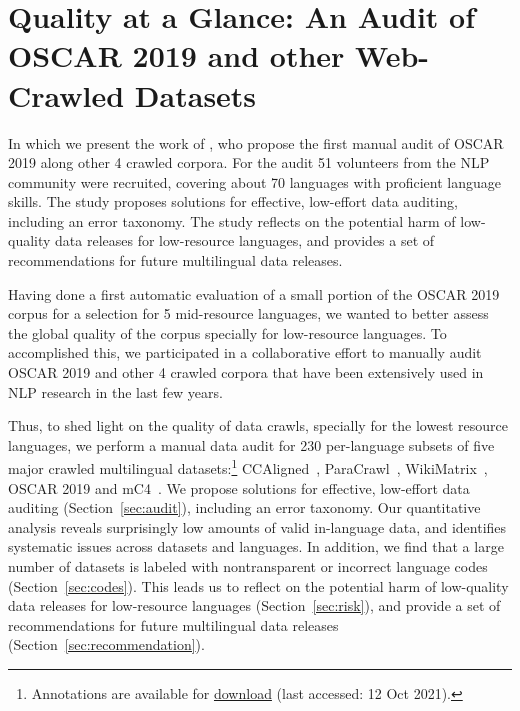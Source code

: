 \chapter{Quality at a Glance: An Audit of OSCAR 2019 and other Web-Crawled Datasets} \label{chap:quality}

\begin{center}
    \begin{minipage}{0.66\textwidth}
        \begin{small}
            In which we present the work of \citet{kreutzer-etal-2021-quality}, who propose the first manual audit of OSCAR 2019 along other 4 crawled corpora. For the audit 51 volunteers from the NLP community were recruited, covering about 70 languages with proficient language skills. The study proposes solutions for effective, low-effort data auditing, including an error taxonomy. The study reflects on the potential harm of low-quality data releases for low-resource languages, and provides a set of recommendations for future multilingual data releases.
        \end{small}
    \end{minipage}
    \vspace{0.5cm}
\end{center}

Having done a first automatic evaluation of a small portion of the OSCAR 2019 corpus for a selection for 5 mid-resource languages, we wanted to better assess the global quality of the corpus specially for low-resource languages. To accomplished this, we participated in a collaborative effort to manually audit OSCAR 2019 and other 4 crawled corpora that have been extensively used in NLP research in the last few years.

Thus, to shed light on the quality of data crawls, specially for the lowest resource languages, we perform a manual data audit for 230 per-language subsets of five major crawled multilingual datasets:\footnote{Annotations are available for \href{https://storage.googleapis.com/huggingface-nlp/datasets/masakhane_audit_annotations/masakhane_language_audit.zip}{download} (last accessed: 12 Oct 2021).}
CCAligned~\citep{el-kishky-etal-2020-ccaligned}, ParaCrawl~\citep{espla-etal-2019-paracrawl,banon-etal-2020-paracrawl}, WikiMatrix~\citep{schwenk-etal-2021-wikimatrix}, OSCAR 2019 \citep{ortiz-suarez-etal-2019-asynchronous, ortiz-suarez-etal-2020-monolingual} and mC4~\citep{xue-etal-2021-mt5}. We propose solutions for effective, low-effort data auditing (Section~\ref{sec:audit}), including an error taxonomy. Our quantitative analysis reveals surprisingly low amounts of valid in-language data, and identifies systematic issues across datasets and languages. In addition, we find that a large number of datasets is labeled with nontransparent or incorrect language codes (Section~\ref{sec:codes}). This leads us to reflect on the potential harm of low-quality data releases for low-resource languages (Section~\ref{sec:risk}), and provide a set of recommendations for future multilingual data releases (Section~\ref{sec:recommendation}).



